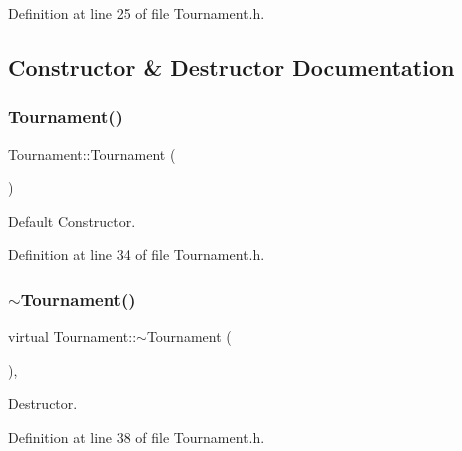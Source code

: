 Definition at line 25 of file Tournament.\+h.



\subsection{Constructor \& Destructor Documentation}
\hypertarget{class_tournament_a87cc832c6612caebcab61d1bea7ef1ac}{}\label{class_tournament_a87cc832c6612caebcab61d1bea7ef1ac} 
\subsubsection{\texorpdfstring{Tournament()}{Tournament()}\hspace{0.1cm}{\footnotesize\ttfamily [1/4]}}
{\footnotesize\ttfamily Tournament\+::\+Tournament (\begin{DoxyParamCaption}{ }\end{DoxyParamCaption})\hspace{0.3cm}{\ttfamily [inline]}}



Default Constructor. 



Definition at line 34 of file Tournament.\+h.

\hypertarget{class_tournament_a255677d318362ae4dc23b9d6a3359f61}{}\label{class_tournament_a255677d318362ae4dc23b9d6a3359f61} 
\subsubsection{\texorpdfstring{$\sim$\+Tournament()}{~Tournament()}}
{\footnotesize\ttfamily virtual Tournament\+::$\sim$\+Tournament (\begin{DoxyParamCaption}{ }\end{DoxyParamCaption})\hspace{0.3cm}{\ttfamily [inline]}, {\ttfamily [virtual]}}



Destructor. 



Definition at line 38 of file Tournament.\+h.

\hypertarget{class_tournament_a653ee8a664677bf0f757234150fa71f8}{}\label{class_tournament_a653ee8a664677bf0f757234150fa71f8} 
